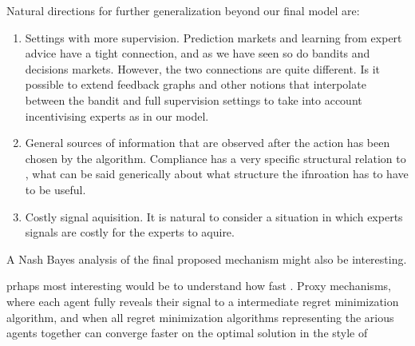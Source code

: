 Natural directions for further generalization beyond our final model are:

\begin{enumerate}

\item Settings with more supervision. Prediction markets and learning from expert advice have a tight connection, and as we have seen so do bandits and decisions markets. However, the two connections are quite different. Is it possible to extend feedback graphs and other notions that interpolate between the bandit and full supervision settings to take into account incentivising experts as in our model. 

\item General sources of information that are observed after the action has been chosen by the algorithm. Compliance has a very specific structural relation to , what can be said generically about what structure the ifnroation has to have to be useful.

\item Costly signal aquisition. It is natural to consider a situation in which experts signals are costly for the experts to aquire.  

\end{enumerate}

A Nash Bayes analysis of the final proposed mechanism might also be interesting.

 prhaps most interesting would be to understand how fast .
Proxy mechanisms, where each agent fully reveals their signal to a intermediate regret minimization algorithm, and when all regret minimization algorithms representing the arious agents together can converge faster on the optimal solution in the style of \cite{syrgkanis2015fast}




